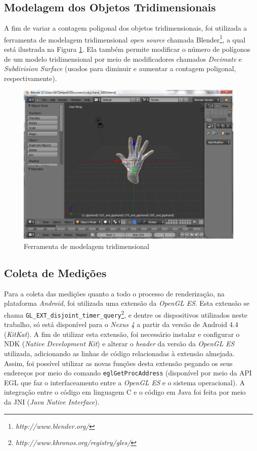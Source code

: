 \subsection{Modelagem dos Objetos Tridimensionais}

 A fim de variar a contagem poligonal dos objetos tridimensionais, foi utilizada a ferramenta de modelagem tridimensional \textit{open source} chamada Blender\footnote{\textit{http://www.blender.org/}}, a qual está ilustrada na Figura \ref{blender}. Ela também permite modificar o número de polígonos de um modelo tridimensional por meio de modificadores chamados \textit{Decimate} e \textit{Subdivision Surface} (usados para diminuir e aumentar a contagem poligonal, respectivamente). 

	\begin{figure}[ht]
	\centering
		\includegraphics[keepaspectratio=true,scale=0.6]{figuras/blender.jpg}
	\caption{Ferramenta de modelagem tridimensional}
	\label{blender}
	\end{figure}

\subsection{Coleta de Medições}
\label{medicoes}

	Para a coleta das medições quanto a todo o processo de renderização, na plataforma \textit{Android}, foi utilizada uma extensão da \textit{OpenGL ES}. Esta extensão se chama \texttt{GL\_EXT\_disjoint\_timer\_query}\footnote{\textit{http://www.khronos.org/registry/gles/}}, e dentre os dispositivos utilizados neste trabalho, só está disponível para o \textit{Nexus 4} a partir da versão de Android 4.4 (\textit{KitKat}). A fim de utilizar esta extensão, foi necessário instalar e configurar o NDK (\textit{Native Development Kit}) e alterar o \textit{header} da versão da \textit{OpenGL ES} utilizada, adicionando as linhas de código relacionadas à extensão almejada. Assim, foi possível utilizar as novas funções desta extensão pegando os seus endereços por meio do comando \texttt{eglGetProcAddress} (disponível por meio da API EGL que faz o interfaceamento entre a \textit{OpenGL ES} e o sistema operacional). A integração entre o código em linguagem C e o código em Java foi feita por meio da JNI (\textit{Java Native Interface}). 


